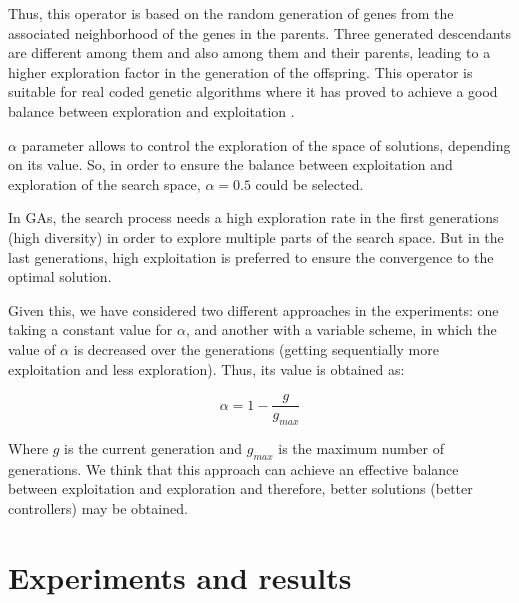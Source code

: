 \documentclass[10pt,journal,compsoc]{IEEEtran}
\begin{document}
Thus, this operator is based on the random generation of genes from the associated neighborhood of the genes in the parents. Three generated descendants are different among them and also among them and their parents, leading to a higher exploration factor in the generation of the offspring.
This operator is suitable for real coded genetic algorithms where it has proved to achieve a good balance between exploration and exploitation \cite{blx2008}.

$\alpha$ parameter allows to control the exploration of the space of solutions, depending on its value. So, in order to ensure the balance between exploitation and exploration of the search space, $\alpha = 0.5$ could be selected.

In GAs, the search process needs a high exploration rate in the first generations (high diversity) in order to explore multiple parts of the search space. But in the last generations, high exploitation is preferred to ensure the convergence to the optimal solution.

Given this, we have considered two different approaches in the experiments: one taking a constant value for $\alpha$, and another with a variable scheme, in which the value of $\alpha$ is decreased over the generations (getting sequentially more exploitation and less exploration). Thus, its value is obtained as:

 \begin{equation}
 	\label{eqalpha}
 	\alpha =1-\frac{g}{g_{max}}
 \end{equation}

Where $g$ is the current generation and $g_{max}$ is the maximum number of generations. We think that this approach can achieve an effective balance between exploitation and exploration and therefore, better solutions (better controllers) may be obtained.



\section{Experiments and results}  
\label{sec:results}
\end{document}
